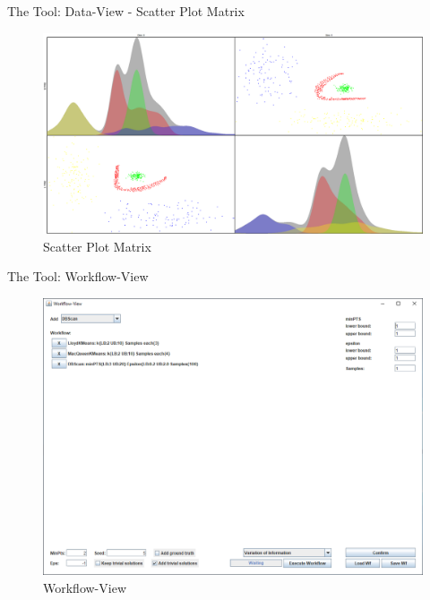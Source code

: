 \documentclass[aspectratio=169]{beamer}
\begin{document}
\begin{frame}{The Tool: Data-View - Scatter Plot Matrix}
	
	\begin{figure}
	  \centering
	    \includegraphics[width=.97\textwidth]{scatter_matrix}
	  \caption{Scatter Plot Matrix}
	  \label{fig:scatter_matrix}
	\end{figure}

\end{frame}

\begin{frame}{The Tool: Workflow-View}
	
	\begin{figure}
	  \centering
	    \includegraphics[width=.7\textwidth]{workflow-view-tasks}
	  \caption{Workflow-View}
	  \label{fig:workflow-view}
	\end{figure}

\end{frame}
\end{document}
